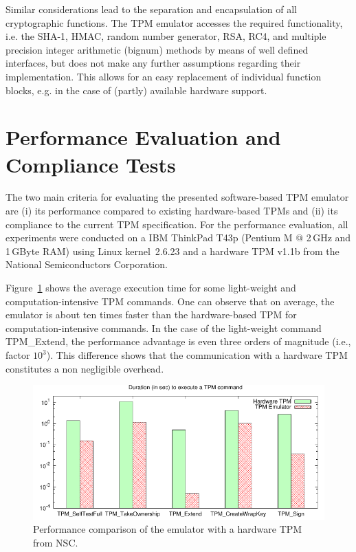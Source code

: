 \documentclass[runningheads]{llncs}
\begin{document}
Similar considerations lead to the separation and encapsulation of all
cryptographic functions. The TPM emulator accesses the required functionality,
i.e. the SHA-1, HMAC, random number generator, RSA, RC4, and multiple
precision integer arithmetic (bignum) methods by means of well defined
interfaces, but does not make any further assumptions regarding their
implementation. This allows for an easy replacement of individual function
blocks, e.g. in the case of (partly) available hardware support.


\section{Performance Evaluation and Compliance Tests}\label{sec:state}
The two main criteria for evaluating the presented software-based TPM
emulator are (i) its performance compared to existing hardware-based TPMs and
(ii) its compliance to the current TPM specification. For the performance
evaluation, all experiments were conducted on a IBM ThinkPad T43p (Pentium M @
2\,GHz and 1\,GByte RAM) using Linux kernel~2.6.23 and a hardware TPM v1.1b
from the National Semiconductors Corporation.

Figure~\ref{plot:performance} shows the average execution time for some
light-weight and com\-pu\-ta\-tion-intensive TPM commands. One can observe
that on average, the emulator is about ten times faster than the hardware-based
TPM for computation-intensive commands. In the case of the light-weight
command \textsf{TPM\_Extend}, the performance advantage is even three orders
of magnitude (i.e., factor $10^3$). This difference shows that the
communication with a hardware TPM constitutes a non negligible overhead.

\begin{figure}[ht]
    \centering
    \includegraphics[width=.8\textwidth]{plots/performance_comparison}
    \caption{Performance comparison of the emulator with a hardware
             TPM from NSC.}
    \label{plot:performance}
\end{figure}
\end{document}

